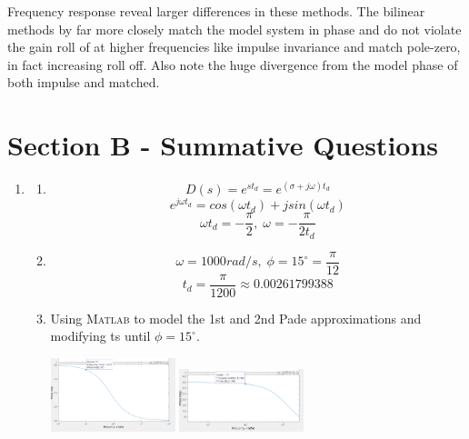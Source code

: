 \documentclass[11pt]{article}
\newcommand{\matlab}{\textsc{Matlab }} %
\begin{document}
\begin{preview}
\begin{enumerate}
    Frequency response reveal larger differences in these methods. The bilinear methods by far more closely match the model system in phase and do not violate the gain roll of at higher frequencies like impulse invariance and match pole-zero, in fact increasing roll off. Also note the huge divergence from the model phase of both impulse and matched.
\end{enumerate}

\section*{Section B - Summative Questions}
\begin{enumerate}
    \item 
    \begin{enumerate}
        \item $$D(s)=e^{st_{d}} = e^{(\sigma+j\omega)t_{d}}$$
        $$e^{j\omega t_d} = cos(\omega t_d) + jsin(\omega t_d)$$
        $$\omega t_d = -\frac{\pi}{2},\; \omega = -\frac{\pi}{2t_d}$$
        \item $$\omega = 1000 rad/s, \; \phi=15^{\circ} = \frac{\pi}{12}$$
        $$t_d = \frac{\pi}{1200} \approx 0.00261799388  $$
        \item Using \matlab to model the 1st and 2nd Pade approximations and modifying ts until $\phi=15^{\circ}$. 
            \begin{center}
                \includegraphics[width=0.3\textwidth]{fig/b1c_270u.png}
                \includegraphics[width=0.3\textwidth]{fig/b1c_2_261u.png}


\end{center}
\end{enumerate}
\end{enumerate}
\end{preview}
\end{document}
